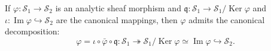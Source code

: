 If $\varphi: \mathcal{S}_1 \rightarrow \mathcal{S}_2$ is an analytic sheaf morphism and $\mathfrak{q}: \mathcal{S}_1 \rightarrow \mathcal{S}_1/\operatorname{Ker}\varphi$ and $\iota: \operatorname{Im}\varphi \hookrightarrow \mathcal{S}_2$ are the canonical mappings, then $\varphi$ admits the canonical decomposition:
$$
\varphi = \iota \circ \bar{\varphi} \circ \mathfrak{q}: \mathcal{S}_1 \twoheadrightarrow \mathcal{S}_1/\operatorname{Ker}\varphi \simeq \operatorname{Im}\varphi \hookrightarrow \mathcal{S}_2.
$$
